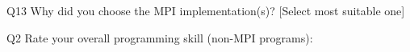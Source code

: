 \begin{description}%
\item{Q13} Why did you choose the MPI implementation(s)? [Select most suitable one]%
\item{Q2} Rate your overall programming skill (non-MPI programs):%
\end{description}%
